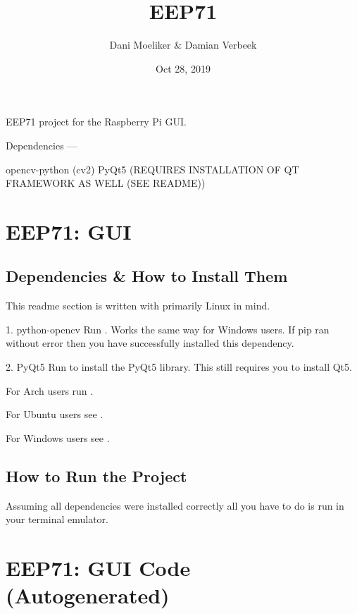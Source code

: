 \documentclass[letterpaper,10pt,english]{sphinxmanual}
\title{EEP71}
\date{Oct 28, 2019}
\author{Dani Moeliker \& Damian Verbeek}
\begin{document}
\pagestyle{empty}
\sphinxmaketitle
\pagestyle{plain}
\sphinxtableofcontents
\pagestyle{normal}
\label{\detokenize{index::doc}}


EEP71 project for the Raspberry Pi GUI.

Dependencies
—

opencv-python (cv2)
PyQt5 (REQUIRES INSTALLATION OF QT FRAMEWORK AS WELL (SEE README))


\chapter{EEP71: GUI}
\label{\detokenize{readme:eep71-gui}}\label{\detokenize{readme::doc}}

\section{Dependencies \& How to Install Them}
\label{\detokenize{readme:dependencies-how-to-install-them}}
This readme section is written with primarily Linux in mind.

1. python-opencv
Run . Works the same way for Windows users.
If pip ran without error then you have successfully installed this dependency.

2. PyQt5
Run  to install the PyQt5 library. This still requires you to install Qt5.

For Arch users run .

For Ubuntu users see .

For Windows users see .


\section{How to Run the Project}
\label{\detokenize{readme:how-to-run-the-project}}
Assuming all dependencies were installed correctly all you have to do is run  in your terminal emulator.


\chapter{EEP71: GUI Code (Autogenerated)}
\label{\detokenize{code:eep71-gui-code-autogenerated}}\label{\detokenize{code::doc}}\label{\detokenize{code:module-mainwindow}}
\end{document}
